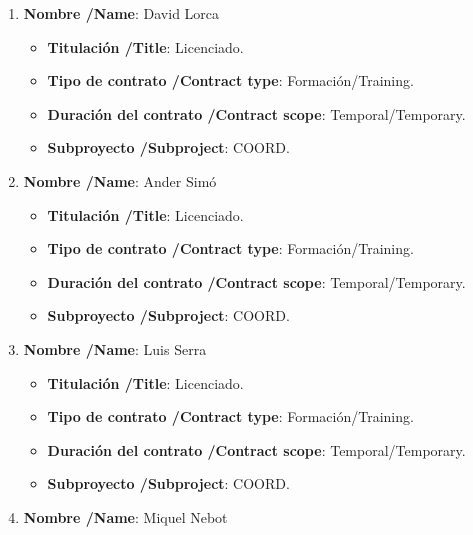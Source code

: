 

\begin{enumerate}
\item {\bf Nombre /Name}: David Lorca
\begin{itemize}
\item {\bf Titulación /Title}: Licenciado. 
\item {\bf Tipo de contrato /Contract type}: Formación/Training. 
\item {\bf Duración del contrato /Contract scope}: Temporal/Temporary. 
\item {\bf Subproyecto /Subproject}: COORD. 
\end{itemize}
\item {\bf Nombre /Name}: Ander Simó
\begin{itemize}
\item {\bf Titulación /Title}: Licenciado. 
\item {\bf Tipo de contrato /Contract type}: Formación/Training. 
\item {\bf Duración del contrato /Contract scope}: Temporal/Temporary. 
\item {\bf Subproyecto /Subproject}: COORD. 
\end{itemize}
\item {\bf Nombre /Name}: Luis Serra
\begin{itemize}
\item {\bf Titulación /Title}: Licenciado. 
\item {\bf Tipo de contrato /Contract type}: Formación/Training. 
\item {\bf Duración del contrato /Contract scope}: Temporal/Temporary. 
\item {\bf Subproyecto /Subproject}: COORD. 
\end{itemize}
\item {\bf Nombre /Name}: Miquel Nebot

\end{enumerate}

